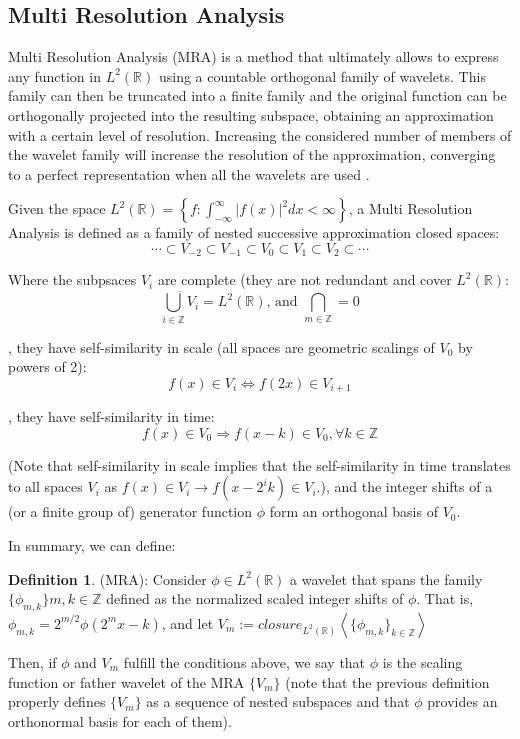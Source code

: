 \documentclass[12,twoside]{mammeTFM}
\theoremstyle{definition}
\newtheorem{definition}[thm]{Definition}
\theoremstyle{remark}
\newcommand{\Z}{\ensuremath{\mathbb{Z}}}
\newcommand{\R}{\ensuremath{\mathbb{R}}}
\begin{document}
\subsection{Multi Resolution Analysis} \label{def:mra}
Multi Resolution Analysis (MRA) is a method that ultimately allows to express any function in $L^2(\R)$ using a countable orthogonal family of wavelets. This family can then be truncated into a finite family and the original function can be orthogonally projected into the resulting subspace, obtaining an approximation with a certain level of resolution. Increasing the considered number of members of the wavelet family will increase the resolution of the approximation, converging to a perfect representation when all the wavelets are used \cite{tour}.

Given the space $L^2(\R) = \left\{f: \int_{-\infty}^{\infty}{|f(x)|^2 dx < \infty} \right\}$, a Multi Resolution Analysis is defined as 
a family of nested successive approximation closed spaces:
$$ \cdots \subset V_{-2} \subset V_{-1} \subset V_0 \subset V_1 \subset V_2 \subset \cdots $$

Where the subpsaces $V_i$ are complete (they are not redundant and cover $L^2(\R)$:
$$\overline{\bigcup_{i\in{\Z}}{V_i}} = L^2(\R) \text{, and } \bigcap_{m\in{\Z}} = {0}$$

, they have self-similarity in scale (all spaces are geometric scalings of $V_0$ by powers of 2):
$$ f(x) \in V_i \Leftrightarrow f(2x) \in V_{i + 1} $$

, they have self-similarity in time:
$$ f(x) \in V_0 \Rightarrow f(x - k) \in V_0, \forall k \in \Z $$

(Note that self-similarity in scale implies that the self-similarity in time translates to all spaces $V_i$ as $f(x) \in V_i \rightarrow f(x - 2^i k) \in V_i$.), and the integer shifts of a (or a finite group of) generator function $\phi$ form an orthogonal basis of $V_0$. 

In summary, we can define:

\begin{definition} \label{def:mra} (MRA): Consider $\phi \in L^2(\R)$ a wavelet that spans the family $\{\phi_{m,k}\}m,k\in\Z$ defined as the normalized scaled integer shifts of $\phi$. That is, $\phi_{m,k} = 2^{m/2}\phi(2^m x - k)$, and let $V_m := closure_{L^2(\R)}\left\langle\{\phi_{m,k}\}_{k \in \Z}\right\rangle$ 
\end{definition}

Then, if $\phi$ and $V_m$ fulfill the conditions above, we say that $\phi$ is the scaling function or father wavelet of the MRA $\{V_m\}$ (note that the previous definition properly defines $\{V_m\}$ as a sequence of nested subspaces and that $\phi$ provides an orthonormal basis for each of them).
\end{document}
